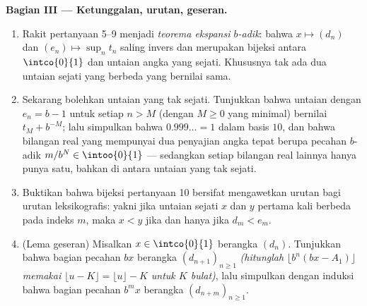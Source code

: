 \begin{problem}
\medskip
\noindent\textbf{Bagian III --- Ketunggalan, urutan, geseran.}
\begin{enumerate}[resume]
  \item Rakit pertanyaan 5--9 menjadi \emph{teorema ekspansi
        $b$-adik}: bahwa  $x \mapsto (d_n)$ dan $(e_n) \mapsto
        \sup_n t_n$ saling invers dan merupakan bijeksi antara
        $\intco{0}{1}$ dan  untaian angka yang sejati. Khususnya
        tak ada dua untaian sejati yang berbeda yang bernilai sama.
  \item Sekarang bolehkan untaian yang tak sejati. Tunjukkan bahwa untaian dengan $e_n
        = b - 1$ untuk setiap $n > M$ (dengan $M \geq 0$ yang minimal) bernilai
        $t_M + b^{-M}$; lalu simpulkan bahwa $0.999\dots = 1$ dalam
        basis $10$, dan bahwa bilangan real yang mempunyai dua penyajian
        angka tepat berupa pecahan $b$-adik
        $m/b^N \in \intoo{0}{1}$ --- sedangkan setiap bilangan real lainnya hanya punya
        satu, bahkan di antara untaian yang tak sejati.
  \item Buktikan bahwa bijeksi pertanyaan 10 bersifat
        mengawetkan urutan bagi urutan leksikografis: yakni jika
        untaian sejati $x$ dan $y$ pertama kali berbeda pada indeks $m$,
        maka $x < y$ jika dan hanya jika $d_m < e_m$.
  \item (Lema geseran) Misalkan $x \in \intco{0}{1}$ berangka
        $(d_n)$. Tunjukkan bahwa bagian pecahan $bx$ berangka
        $(d_{n+1})_{n \geq 1}$ \emph{(hitunglah $\lfloor b^n(bx -
        A_1)\rfloor$ memakai $\lfloor u - K \rfloor = \lfloor u
        \rfloor - K$ untuk $K$ bulat)}, lalu simpulkan dengan induksi
        bahwa bagian pecahan $b^m x$ berangka
        $(d_{n+m})_{n \geq 1}$.
\end{enumerate}


\end{problem}
